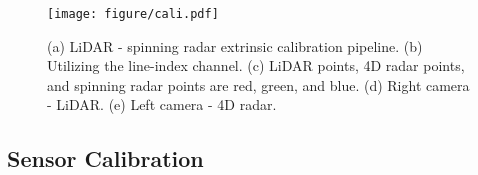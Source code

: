 



\begin{figure}[!t]
    \centering
    \texttt{[image: figure/cali.pdf]}
    \caption{(a) LiDAR - spinning radar extrinsic calibration pipeline. (b) Utilizing the line-index channel. (c) LiDAR points, 4D radar points, and spinning radar points are red, green, and blue. (d)   Right camera - LiDAR. (e) Left camera - 4D radar.}
    \label{fig:cali}
    \vspace{-5mm}
\end{figure}

\subsection{ Sensor Calibration}


